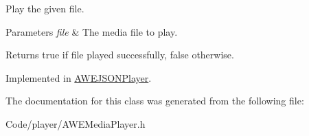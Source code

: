 Play the given file. 


\begin{DoxyParams}{Parameters}
{\em file} & The media file to play.\\
\hline
\end{DoxyParams}
\begin{DoxyReturn}{Returns}
{\ttfamily true} if {\ttfamily file} played successfully, {\ttfamily false} otherwise. 
\end{DoxyReturn}


Implemented in \hyperlink{class_a_w_e_j_s_o_n_player_ad0644f79fa7c565baff0a3c9ec4d73af}{A\-W\-E\-J\-S\-O\-N\-Player}.



The documentation for this class was generated from the following file\-:\begin{DoxyCompactItemize}
\item 
Code/player/A\-W\-E\-Media\-Player.\-h\end{DoxyCompactItemize}
